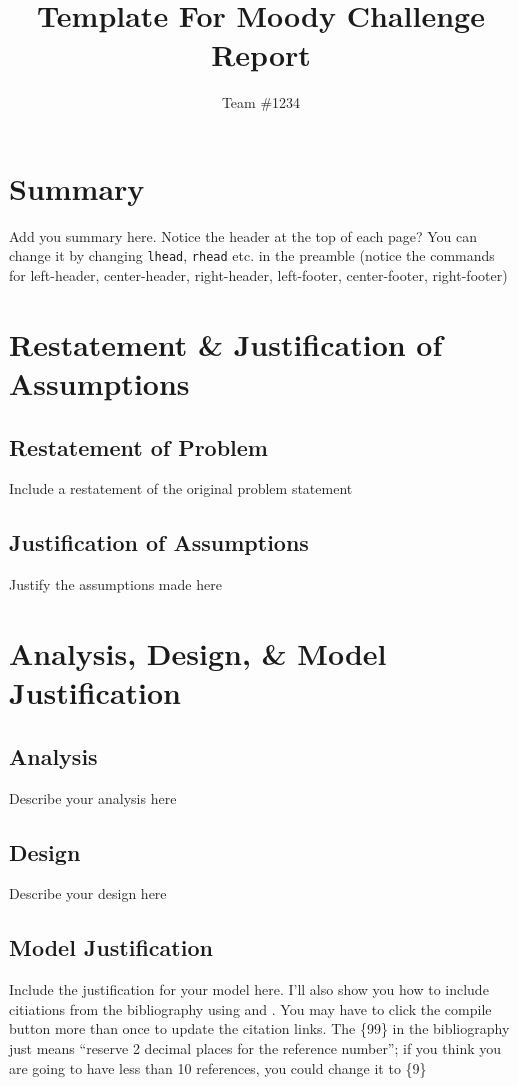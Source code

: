 \documentclass[12pt]{report}
\title{Template For Moody Challenge Report}
\author{Team \#1234}
\begin{document}
\maketitle
\tableofcontents

\chapter{Summary}
Add you summary here. Notice the header at the top of each page? You can change it by changing \texttt{lhead}, \texttt{rhead} etc. in the preamble (notice the commands for left-header, center-header, right-header, left-footer, center-footer, right-footer)


\chapter{Restatement \& Justification of Assumptions}

\section{Restatement of Problem}
Include a restatement of the original problem statement

\section{Justification of Assumptions}
Justify the assumptions made here

\chapter{Analysis, Design, \& Model Justification}

\section{Analysis}
Describe your analysis here

\section{Design}
Describe your design here

\section{Model Justification}
Include the justification for your model here. I'll also show you how to include citiations from the bibliography using \cite{lamport94} and \cite{donnellan14}. You may have to click the compile button more than once to update the citation links. The \{99\} in the bibliography just means ``reserve 2 decimal places for the reference number''; if you think you are going to have less than 10 references, you could change it to \{9\}
\end{document}
